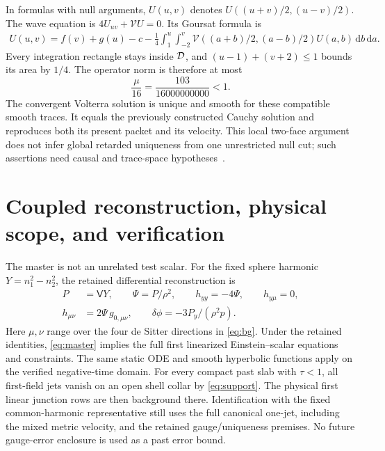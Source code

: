 \documentclass[11pt]{article}
\newcommand{\dd}{\,\mathrm d}
\begin{document}
In formulas with null arguments, $U(u,v)$ denotes
$U((u+v)/2,(u-v)/2)$. The wave equation is
$4U_{uv}+\mathcal VU=0$. Its Goursat formula is
\begin{equation}
\begin{aligned}
 U(u,v)=f(v)+g(u)-c-\frac14\int_1^u\int_{-2}^v
 \mathcal V((a+b)/2,(a-b)/2)U(a,b)\dd b\dd a .
\end{aligned}
\label{eq:goursat}
\end{equation}
Every integration rectangle stays inside $ {\cal D}$, and
$(u-1)+(v+2)\le1$ bounds its area by $1/4$.
The operator norm is therefore at most
\begin{equation}
 \frac\mu{16}=\frac{103}{16000000000}<1 .
 \label{eq:nullfactor}
\end{equation}
The convergent Volterra solution is unique and smooth for these compatible
smooth traces. It equals the previously constructed Cauchy solution and
reproduces both its present packet and its velocity.
This local two-face argument does not infer global retarded uniqueness
from one unrestricted null cut; such assertions need causal and
trace-space hypotheses~\cite{btw}.

\section{Coupled reconstruction, physical scope, and verification}
The master is not an unrelated test scalar. For the fixed sphere harmonic
$Y=n_1^2-n_2^2$, the retained differential reconstruction is
\begin{equation}
\begin{aligned}
 P&=\mathsf VY,\qquad \Psi=P/\rho^2,\qquad
 h_{yy}=-4\Psi,\qquad h_{y\mu}=0,\\
 h_{\mu\nu}&=2\Psi\,g_{0,\mu\nu},\qquad
 \delta\phi=-3P_y/(\rho^2p).
\end{aligned}
\label{eq:reconstruct}
\end{equation}
Here $\mu,\nu$ range over the four de Sitter directions in
\eqref{eq:bg}. Under the retained identities, \eqref{eq:master}
implies the full first linearized Einstein--scalar equations and
constraints. The same static ODE and smooth hyperbolic functions apply
on the verified negative-time domain.
For every compact past slab with $\tau<1$, all first-field jets vanish
on an open shell collar by \eqref{eq:support}. The physical first linear
junction rows are then background there. Identification with the fixed
common-harmonic representative still uses the full canonical one-jet,
including the mixed metric velocity, and the retained gauge/uniqueness
premises. No future gauge-error enclosure is used as a past error bound.
\end{document}
